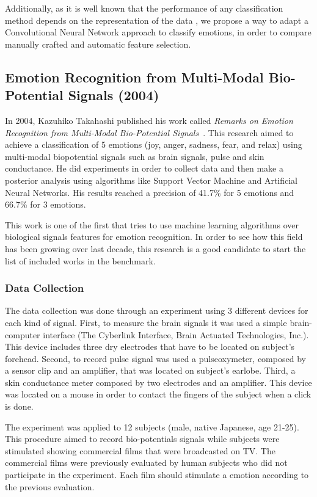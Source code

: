 \documentclass{sig-alternate}
\begin{document}
Additionally, as it is well known that the performance of any 
classification method depends on the representation of the data 
\cite{bengio2013representation}, 
we propose a way to adapt a Convolutional Neural 
Network approach to classify emotions, in order to compare  manually
crafted and automatic feature selection. 

\subsection{Emotion Recognition from Multi-Modal Bio-Potential Signals (2004)}	

In 2004, Kazuhiko Takahashi published his work called 
\textit{Remarks on Emotion Recognition from Multi-Modal Bio-Potential Signals}~\cite{takahashi2004}. This 
research aimed to achieve a classification of 5 emotions (joy, anger, sadness, fear, and relax)
using multi-modal biopotential signals such as brain signals, pulse and skin conductance. He
 did experiments in order to collect data and then make a posterior analysis using algorithms
 like Support Vector Machine and Artificial Neural Networks. His results reached a precision of
 41.7\% for 5 emotions and 66.7\% for 3 emotions. 

This work is one of the first that tries to use machine learning algorithms
 over biological signals features for emotion recognition. In order to see
 how this field has been growing over last decade, this research is a good
 candidate to start the list of included works in the benchmark.  

\subsubsection{Data Collection}

The data collection was done through an experiment using 3 different devices for each kind of signal. 
First, to measure the brain signals it was used a simple brain-computer interface
(The Cyberlink Interface, Brain Actuated Technologies, Inc.). This device includes 
three dry electrodes that have to be located on subject's forehead. Second, to record 
pulse signal was used a pulseoxymeter, composed by a sensor clip and an amplifier, that 
was located on subject's earlobe. Third, a skin conductance meter composed by
two electrodes and an amplifier. This device was located on a mouse in order to 
contact the fingers of the subject when a click is done. 

The experiment was applied to 12 subjects (male, native Japanese, age 21-25). This
procedure aimed to record bio-potentials signals while subjects were stimulated showing commercial 
films that were broadcasted on TV. The commercial films were previously evaluated by 
human subjects who did not participate in the experiment. Each film should stimulate a 
emotion according to the previous evaluation.
\end{document}

